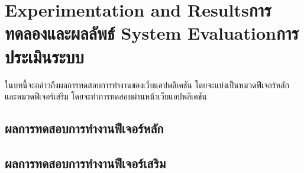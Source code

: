 \chapter{\ifproject%
\ifenglish Experimentation and Results\else การทดลองและผลลัพธ์\fi
\else%
\ifenglish System Evaluation\else การประเมินระบบ\fi
\fi}

\hspace{4ex} 
ในบทนี้จะกล่าวถึงผลการทดสอบการทำงานของเว็บแอปพลิเคชัน โดยจะแบ่งเป็นหมวดฟีเจอร์หลัก และหมวดฟีเจอร์เสริม โดยจะทำการทดสอบผ่านหน้าเว็บแอปพลิเคชัน

\section{ผลการทดสอบการทำงานฟีเจอร์หลัก}

\section{ผลการทดสอบการทำงานฟีเจอร์เสริม}